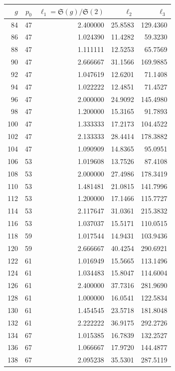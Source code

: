 \documentclass[11pt]{article}
\theoremstyle{definition}
\theoremstyle{remark}
\begin{document}
\begin{table}[ht]
\centering
{\small
\begin{tabular}{rrrrr}
\toprule
$g$ & $p_0$ & $\ell_1 = \mathfrak{S}(g)/\mathfrak{S}(2)$ & $\ell_2$ & $\ell_3$ \\
\midrule
84 & 47 & 2.400000 & 25.8583 & 129.4360 \\
86 & 47 & 1.024390 & 11.4282 & 59.3230 \\
88 & 47 & 1.111111 & 12.5253 & 65.7569 \\
90 & 47 & 2.666667 & 31.1566 & 169.9885 \\
92 & 47 & 1.047619 & 12.6201 & 71.1408 \\
94 & 47 & 1.022222 & 12.4851 & 71.4527 \\
96 & 47 & 2.000000 & 24.9092 & 145.4980 \\
98 & 47 & 1.200000 & 15.3165 & 91.7893 \\
100 & 47 & 1.333333 & 17.2173 & 104.4522 \\
102 & 47 & 2.133333 & 28.4414 & 178.3882 \\
104 & 47 & 1.090909 & 14.8365 & 95.0951 \\
106 & 53 & 1.019608 & 13.7526 & 87.4108 \\
108 & 53 & 2.000000 & 27.4986 & 178.3419 \\
110 & 53 & 1.481481 & 21.0815 & 141.7996 \\
112 & 53 & 1.200000 & 17.1466 & 115.7727 \\
114 & 53 & 2.117647 & 31.0361 & 215.3832 \\
116 & 53 & 1.037037 & 15.5171 & 110.0515 \\
118 & 59 & 1.017544 & 14.9431 & 103.9436 \\
120 & 59 & 2.666667 & 40.4254 & 290.6921 \\
122 & 61 & 1.016949 & 15.5665 & 113.1496 \\
124 & 61 & 1.034483 & 15.8047 & 114.6004 \\
126 & 61 & 2.400000 & 37.7316 & 281.9690 \\
128 & 61 & 1.000000 & 16.0541 & 122.5834 \\
130 & 61 & 1.454545 & 23.5718 & 181.8048 \\
132 & 61 & 2.222222 & 36.9175 & 292.2726 \\
134 & 67 & 1.015385 & 16.7839 & 132.2527 \\
136 & 67 & 1.066667 & 17.9720 & 144.4877 \\
138 & 67 & 2.095238 & 35.5301 & 287.5119 \\

\end{tabular}}
\end{table}
\end{document}
